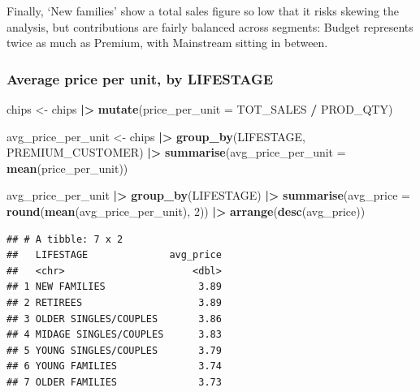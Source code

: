 \documentclass[
]{article}
\newenvironment{Shaded}{\begin{snugshade}}{\end{snugshade}}
\newcommand{\AttributeTok}[1]{\textcolor[rgb]{0.13,0.29,0.53}{#1}}
\newcommand{\DecValTok}[1]{\textcolor[rgb]{0.00,0.00,0.81}{#1}}
\newcommand{\FunctionTok}[1]{\textcolor[rgb]{0.13,0.29,0.53}{\textbf{#1}}}
\newcommand{\NormalTok}[1]{#1}
\newcommand{\OtherTok}[1]{\textcolor[rgb]{0.56,0.35,0.01}{#1}}
\newcommand{\SpecialCharTok}[1]{\textcolor[rgb]{0.81,0.36,0.00}{\textbf{#1}}}
\begin{document}
Finally, `New families' show a total sales figure so low that it risks
skewing the analysis, but contributions are fairly balanced across
segments: Budget represents twice as much as Premium, with Mainstream
sitting in between.

\subsubsection{Average price per unit, by
LIFESTAGE}\label{average-price-per-unit-by-lifestage}

\begin{Shaded}
\begin{Highlighting}[]
\NormalTok{chips }\OtherTok{\textless{}{-}}\NormalTok{ chips }\SpecialCharTok{|\textgreater{}} 
  \FunctionTok{mutate}\NormalTok{(}\AttributeTok{price\_per\_unit =}\NormalTok{ TOT\_SALES }\SpecialCharTok{/}\NormalTok{ PROD\_QTY)}
\end{Highlighting}
\end{Shaded}

\begin{Shaded}
\begin{Highlighting}[]
\NormalTok{avg\_price\_per\_unit }\OtherTok{\textless{}{-}}\NormalTok{ chips }\SpecialCharTok{|\textgreater{}} 
  \FunctionTok{group\_by}\NormalTok{(LIFESTAGE, PREMIUM\_CUSTOMER) }\SpecialCharTok{|\textgreater{}} 
  \FunctionTok{summarise}\NormalTok{(}\AttributeTok{avg\_price\_per\_unit =} \FunctionTok{mean}\NormalTok{(price\_per\_unit))}

\NormalTok{avg\_price\_per\_unit }\SpecialCharTok{|\textgreater{}} 
  \FunctionTok{group\_by}\NormalTok{(LIFESTAGE) }\SpecialCharTok{|\textgreater{}} 
  \FunctionTok{summarise}\NormalTok{(}\AttributeTok{avg\_price =} \FunctionTok{round}\NormalTok{(}\FunctionTok{mean}\NormalTok{(avg\_price\_per\_unit), }\DecValTok{2}\NormalTok{)) }\SpecialCharTok{|\textgreater{}} 
  \FunctionTok{arrange}\NormalTok{(}\FunctionTok{desc}\NormalTok{(avg\_price))}
\end{Highlighting}
\end{Shaded}

\begin{verbatim}
## # A tibble: 7 x 2
##   LIFESTAGE              avg_price
##   <chr>                      <dbl>
## 1 NEW FAMILIES                3.89
## 2 RETIREES                    3.89
## 3 OLDER SINGLES/COUPLES       3.86
## 4 MIDAGE SINGLES/COUPLES      3.83
## 5 YOUNG SINGLES/COUPLES       3.79
## 6 YOUNG FAMILIES              3.74
## 7 OLDER FAMILIES              3.73
\end{verbatim}
\end{document}
